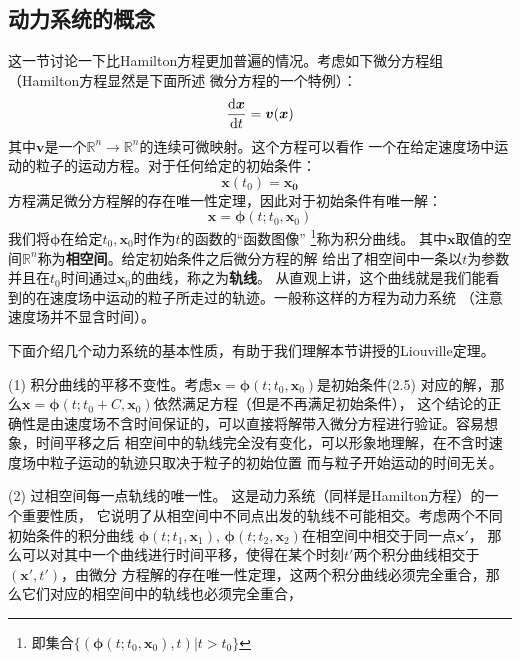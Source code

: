     \subsection{动力系统的概念}
    这一节讨论一下比Hamilton方程更加普遍的情况。考虑如下微分方程组（Hamilton方程显然是下面所述
    微分方程的一个特例）：
    \begin{equation}
        \frac{\mathrm{d}{\bm{x}}}{\mathrm{d}{t}} = \bm{v}(\bm{x})
    \end{equation}
    其中$\bm{v}$是一个$\mathbb{R}^{n}\to\mathbb{R}^{n}$的连续可微映射。这个方程可以看作
    一个在给定速度场中运动的粒子的运动方程。对于任何给定的初始条件：
    \begin{equation}
        \bm{x}(t_0) = \bm{x_0}
    \end{equation}
    方程满足微分方程解的存在唯一性定理\cite{丁同仁2004常微分方程教程}，因此对于初始条件有唯一解：
    \begin{equation}
        \bm{x} = \bm{\phi}(t;t_0, \bm{x}_0)
    \end{equation}
    我们将$\bm{\phi}$在给定$t_0,\bm{x}_0$时作为$t$的函数的“函数图像”
    \footnote{即集合$\{(\bm{\phi}(t;t_0,\bm{x}_0), t)|t>t_0\}$}称为积分曲线。
    其中$\bm{x}$取值的空间$\mathbb{R}^n$称为\textbf{相空间}。给定初始条件之后微分方程的解
    给出了相空间中一条以$t$为参数并且在$t_0$时间通过$\bm{x}_0$的曲线，称之为\textbf{轨线}。
    从直观上讲，这个曲线就是我们能看到的在速度场中运动的粒子所走过的轨迹。一般称这样的方程为动力系统
    （注意速度场并不显含时间）。
    \par 下面介绍几个动力系统的基本性质，有助于我们理解本节讲授的Liouville定理。
    \par (1) 积分曲线的平移不变性。考虑$\bm{x} = \bm{\phi}(t;t_0,\bm{x}_0)$是初始条件(2.5)
    对应的解，那么$\bm{x} = \bm{\phi}(t;t_0 + C,\bm{x}_0)$依然满足方程（但是不再满足初始条件），
    这个结论的正确性是由速度场不含时间保证的，可以直接将解带入微分方程进行验证。容易想象，时间平移之后
    相空间中的轨线完全没有变化，可以形象地理解，在不含时速度场中粒子运动的轨迹只取决于粒子的初始位置
    而与粒子开始运动的时间无关。
    \par (2) 过相空间每一点轨线的唯一性。 这是动力系统（同样是Hamilton方程）的一个重要性质，
    它说明了从相空间中不同点出发的轨线不可能相交。考虑两个不同初始条件的积分曲线
    $\bm{\phi}(t;t_1,\bm{x}_1),\, \bm{\phi}(t; t_2, \bm{x}_2)$在相空间中相交于同一点$\bm{x}'$，
    那么可以对其中一个曲线进行时间平移，使得在某个时刻$t'$两个积分曲线相交于$(\bm{x}', t')$，由微分
    方程解的存在唯一性定理，这两个积分曲线必须完全重合，那么它们对应的相空间中的轨线也必须完全重合，

